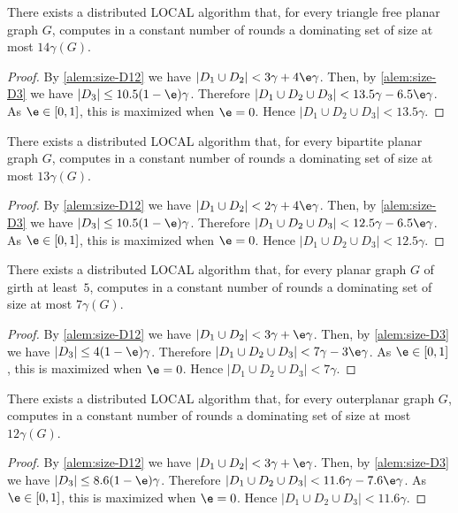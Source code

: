 \begin{theorem}\label{thm:tri}
There exists a distributed LOCAL algorithm that, for every triangle free planar
graph $G$, computes in a constant number of rounds a dominating set
of size at most $14\gamma(G)$.
\end{theorem}
\begin{proof}
By
\cref{alem:size-D12} we have $|D_1\cup D_2|<3\gamma+4\e\gamma$.  Then,
by \cref{alem:size-D3} we have $|D_3|\le 10.5(1-\e)\gamma$.
%
Therefore $|D_1 \cup D_2 \cup D_3| < 13.5\gamma -6.5\e\gamma$.
%
As $\e\in[0,1]$, this is maximized when $\e=0$. Hence
\mbox{$|D_1 \cup D_2 \cup D_3|< 13.5 \gamma$}.
\end{proof}

\begin{theorem}\label{thm:bip}
  There exists a distributed LOCAL algorithm that, for every bipartite planar graph
  $G$, computes in a constant number of rounds a
  dominating set of size at most $13\gamma(G)$.
\end{theorem}
\begin{proof}
By
\cref{alem:size-D12} we have $|D_1\cup D_2|<2\gamma+4\e\gamma$.  Then,
by \cref{alem:size-D3} we have $|D_3|\le 10.5(1-\e)\gamma$.
%
Therefore $|D_1 \cup D_2 \cup D_3| < 12.5\gamma -6.5\e\gamma$.
%
As $\e\in[0,1]$, this is maximized when $\e=0$. Hence
\mbox{$|D_1 \cup D_2 \cup D_3|< 12.5 \gamma$}.
\end{proof}

\begin{theorem}\label{thm:girth}
  There exists a distributed LOCAL algorithm that, for every planar graph
  $G$ of girth at least~$5$, computes in a constant number of rounds a
  dominating set of size at most $7\gamma(G)$.
\end{theorem}
\begin{proof}
By
\cref{alem:size-D12} we have $|D_1\cup D_2|<3\gamma+\e\gamma$.  Then,
by \cref{alem:size-D3} we have $|D_3|\le 4(1-\e)\gamma$.
%
Therefore $|D_1 \cup D_2 \cup D_3| < 7\gamma -3\e\gamma$.
%
As $\e\in[0,1]$, this is maximized when $\e=0$. Hence
\mbox{$|D_1 \cup D_2 \cup D_3|< 7 \gamma$}.
\end{proof}

\begin{theorem}\label{thm:outer}
  There exists a distributed LOCAL algorithm that, for every outerplanar graph
  $G$, computes in a constant number of rounds a
  dominating set of size at most $12\gamma(G)$.
\end{theorem}
\begin{proof}
By
\cref{alem:size-D12} we have $|D_1\cup D_2|<3\gamma+\e\gamma$.  Then,
by \cref{alem:size-D3} we have $|D_3|\le 8.6(1-\e)\gamma$.
%
Therefore $|D_1 \cup D_2 \cup D_3| < 11.6\gamma -7.6\e\gamma$.
%
As $\e\in[0,1]$, this is maximized when $\e=0$. Hence
\mbox{$|D_1 \cup D_2 \cup D_3|< 11.6 \gamma$}.
\end{proof}


